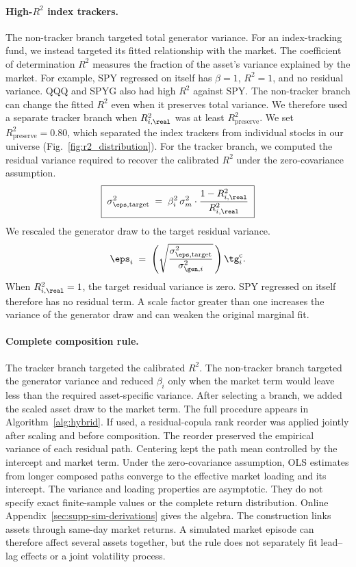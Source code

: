\paragraph{High-$R^2$ index trackers.}

The non-tracker branch targeted total generator variance. For an
index-tracking fund, we instead targeted its fitted relationship with
the market. The coefficient of determination $R^2$ measures the
fraction of the asset's variance explained by the market. For example,
SPY regressed on itself has $\beta=1$, $R^2=1$, and no residual
variance. QQQ and SPYG also had high $R^2$ against SPY. The
non-tracker branch can change the fitted $R^2$ even when it preserves
total variance. We therefore used a separate tracker branch
when $R^2_{i,\real}$ was at least $R^2_{\mathrm{preserve}}$. We set
$R^2_{\mathrm{preserve}}=0.80$, which separated the index trackers from
individual stocks in our universe (Fig.~\ref{fig:r2_distribution}).
For the tracker branch, we computed the residual variance required to
recover the calibrated $R^2$ under the zero-covariance assumption.
\begin{equation}
  \boxed{\;\sigma_{\eps,\mathrm{target}}^2 \;=\; \beta_i^2\, \sigma_m^2 \cdot
    \frac{1 - R^2_{i,\real}}{R^2_{i,\real}}\;}
  \label{eq:r2-target}
\end{equation}
We rescaled the generator draw to the target residual variance.
\begin{equation}
  \eps_i \;=\; \left(\sqrt{\frac{\sigma_{\eps,\mathrm{target}}^2}{\sigma_{\gen,i}^2}}\,\right)\tg_i^{\mathrm c}.
  \label{eq:r2-rescale}
\end{equation}
When $R^2_{i,\real}=1$, the target residual variance is zero. SPY
regressed on itself therefore has no residual term. A scale factor
greater than one increases the variance of the generator draw and can
weaken the original marginal fit.

\paragraph{Complete composition rule.}

The tracker branch targeted the calibrated $R^2$. The non-tracker
branch targeted the generator variance and reduced $\beta_i$ only when
the market term would leave less than the required asset-specific
variance. After selecting a branch, we added the scaled asset draw to
the market term. The full procedure appears in
Algorithm~\ref{alg:hybrid}. If used, a residual-copula rank reorder was
applied jointly after scaling and before composition. The reorder
preserved the empirical variance of each residual path.
Centering kept the path mean controlled by the intercept and market
term. Under the zero-covariance assumption, OLS estimates from longer
composed paths converge to the effective market loading and its
intercept. The variance and loading properties are asymptotic. They
do not specify exact finite-sample values or the complete return
distribution. Online Appendix~\ref{sec:supp-sim-derivations} gives the algebra. The
construction links assets through same-day market returns. A simulated
market episode can therefore affect several assets together, but the
rule does not separately fit lead--lag effects or a joint volatility
process.

